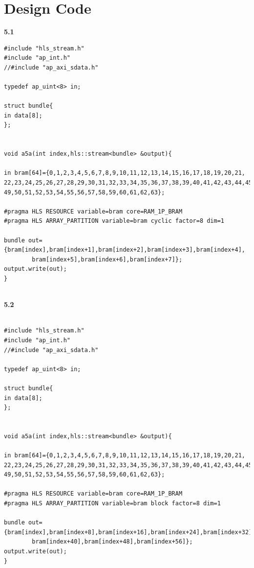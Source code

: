 \documentclass{article}
\begin{document}
\section{Design Code}
\textbf{5.1}
\begin{lstlisting}
#include "hls_stream.h"
#include "ap_int.h"
//#include "ap_axi_sdata.h"

typedef ap_uint<8> in;

struct bundle{
in data[8];
};


void a5a(int index,hls::stream<bundle> &output){

in bram[64]={0,1,2,3,4,5,6,7,8,9,10,11,12,13,14,15,16,17,18,19,20,21,
22,23,24,25,26,27,28,29,30,31,32,33,34,35,36,37,38,39,40,41,42,43,44,45,46,47,48,
49,50,51,52,53,54,55,56,57,58,59,60,61,62,63};

#pragma HLS RESOURCE variable=bram core=RAM_1P_BRAM
#pragma HLS ARRAY_PARTITION variable=bram cyclic factor=8 dim=1

bundle out={bram[index],bram[index+1],bram[index+2],bram[index+3],bram[index+4],
		bram[index+5],bram[index+6],bram[index+7]};
output.write(out);
}


\end{lstlisting}
\vspace{10cm}
\textbf{5.2}
\begin{lstlisting}

#include "hls_stream.h"
#include "ap_int.h"
//#include "ap_axi_sdata.h"

typedef ap_uint<8> in;

struct bundle{
in data[8];
};


void a5a(int index,hls::stream<bundle> &output){

in bram[64]={0,1,2,3,4,5,6,7,8,9,10,11,12,13,14,15,16,17,18,19,20,21,
22,23,24,25,26,27,28,29,30,31,32,33,34,35,36,37,38,39,40,41,42,43,44,45,46,47,48,
49,50,51,52,53,54,55,56,57,58,59,60,61,62,63};

#pragma HLS RESOURCE variable=bram core=RAM_1P_BRAM
#pragma HLS ARRAY_PARTITION variable=bram block factor=8 dim=1

bundle out={bram[index],bram[index+8],bram[index+16],bram[index+24],bram[index+32],
		bram[index+40],bram[index+48],bram[index+56]};
output.write(out);
}

\end{lstlisting}
\vspace{10cm}
\end{document}
